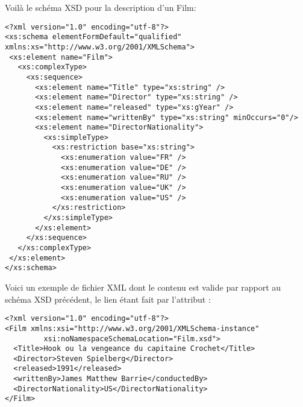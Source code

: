 Voilà le schéma XSD pour la description d'un Film:
\begin{Verbatim}[fontsize=\small,formatcom=\color{black!70}]
<?xml version="1.0" encoding="utf-8"?> 
<xs:schema elementFormDefault="qualified"   xmlns:xs="http://www.w3.org/2001/XMLSchema"> 
 <xs:element name="Film"> 
   <xs:complexType> 
     <xs:sequence> 
       <xs:element name="Title" type="xs:string" /> 
       <xs:element name="Director" type="xs:string" /> 
       <xs:element name="released" type="xs:gYear" /> 
       <xs:element name="writtenBy" type="xs:string" minOccurs="0"/>  
       <xs:element name="DirectorNationality"> 
         <xs:simpleType> 
           <xs:restriction base="xs:string"> 
             <xs:enumeration value="FR" /> 
             <xs:enumeration value="DE" /> 
             <xs:enumeration value="RU" /> 
             <xs:enumeration value="UK" /> 
             <xs:enumeration value="US" /> 
           </xs:restriction> 
         </xs:simpleType> 
       </xs:element> 
     </xs:sequence> 
   </xs:complexType> 
 </xs:element> 
</xs:schema> 
\end{Verbatim}

Voici un exemple de fichier XML dont le contenu est valide par rapport au schéma XSD précédent, le lien étant fait par l'attribut  :
\begin{Verbatim}[fontsize=\small,formatcom=\color{black!70}]
<?xml version="1.0" encoding="utf-8"?> 
<Film xmlns:xsi="http://www.w3.org/2001/XMLSchema-instance" 
         xsi:noNamespaceSchemaLocation="Film.xsd"> 
  <Title>Hook ou la vengeance du capitaine Crochet</Title> 
  <Director>Steven Spielberg</Director> 
  <released>1991</released> 
  <writtenBy>James Matthew Barrie</conductedBy> 
  <DirectorNationality>US</DirectorNationality> 
</Film> 
\end{Verbatim}














